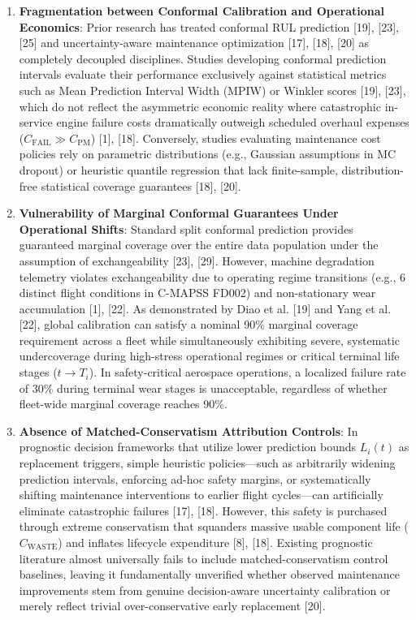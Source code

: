 \documentclass[12pt,a4paper]{article}
\begin{document}
\begin{enumerate}
    \item \textbf{Fragmentation between Conformal Calibration and Operational Economics}: Prior research has treated conformal RUL prediction [19], [23], [25] and uncertainty-aware maintenance optimization [17], [18], [20] as completely decoupled disciplines. Studies developing conformal prediction intervals evaluate their performance exclusively against statistical metrics such as Mean Prediction Interval Width (MPIW) or Winkler scores [19], [23], which do not reflect the asymmetric economic reality where catastrophic in-service engine failure costs dramatically outweigh scheduled overhaul expenses ($C_{\text{FAIL}} \gg C_{\text{PM}}$) [1], [18]. Conversely, studies evaluating maintenance cost policies rely on parametric distributions (e.g., Gaussian assumptions in MC dropout) or heuristic quantile regression that lack finite-sample, distribution-free statistical coverage guarantees [18], [20].
    \item \textbf{Vulnerability of Marginal Conformal Guarantees Under Operational Shifts}: Standard split conformal prediction provides guaranteed marginal coverage over the entire data population under the assumption of exchangeability [23], [29]. However, machine degradation telemetry violates exchangeability due to operating regime transitions (e.g., 6 distinct flight conditions in C-MAPSS FD002) and non-stationary wear accumulation [1], [22]. As demonstrated by Diao et al. [19] and Yang et al. [22], global calibration can satisfy a nominal 90\% marginal coverage requirement across a fleet while simultaneously exhibiting severe, systematic undercoverage during high-stress operational regimes or critical terminal life stages ($t \to T_i$). In safety-critical aerospace operations, a localized failure rate of 30\% during terminal wear stages is unacceptable, regardless of whether fleet-wide marginal coverage reaches 90\%.
    \item \textbf{Absence of Matched-Conservatism Attribution Controls}: In prognostic decision frameworks that utilize lower prediction bounds $L_i(t)$ as replacement triggers, simple heuristic policies—such as arbitrarily widening prediction intervals, enforcing ad-hoc safety margins, or systematically shifting maintenance interventions to earlier flight cycles—can artificially eliminate catastrophic failures [17], [18]. However, this safety is purchased through extreme conservatism that squanders massive usable component life ($C_{\text{WASTE}}$) and inflates lifecycle expenditure [8], [18]. Existing prognostic literature almost universally fails to include matched-conservatism control baselines, leaving it fundamentally unverified whether observed maintenance improvements stem from genuine decision-aware uncertainty calibration or merely reflect trivial over-conservative early replacement [20].

\end{enumerate}
\end{document}
